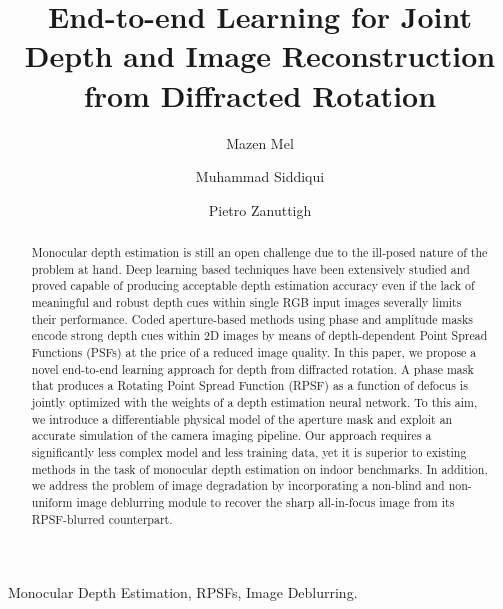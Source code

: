 \documentclass[preprint,5p,twocolumn]{elsarticle}
\begin{document}
\begin{frontmatter}

\title{End-to-end Learning for Joint Depth and Image Reconstruction from Diffracted Rotation}








\author[unipd]{Mazen Mel}
\author[sony]{ Muhammad Siddiqui}
\author[unipd]{Pietro Zanuttigh}


\address[unipd]{Department
of Information Engineering, University of Padova, Italy.}
\address[sony]{Sony Europe B.V., Zweigniederlassung Deutschland Stuttgart Technology Center, Stuttgart, Germany.}

\begin{abstract}
Monocular depth estimation is still an open challenge due to the ill-posed nature of the problem at hand. Deep learning based techniques have been extensively studied and proved capable of producing acceptable depth estimation accuracy even if the lack of meaningful and robust depth cues within single RGB input images severally limits their performance. Coded aperture-based methods using phase and amplitude masks encode strong depth cues within 2D images by means of depth-dependent Point Spread Functions (PSFs) at the price of a reduced image quality. In this paper, we propose a novel end-to-end learning approach for depth from diffracted rotation. A phase mask that produces a Rotating Point Spread Function (RPSF) as a function of defocus is jointly optimized with the weights of a depth estimation neural network. To this aim, we introduce a differentiable physical model of the aperture mask and exploit  an  accurate  simulation  of  the camera  imaging  pipeline. Our approach requires a significantly less complex model and less training data, yet it is superior to existing methods in the task of monocular depth estimation on indoor benchmarks. In addition, we address the problem of image degradation by incorporating a non-blind and non-uniform image deblurring module to recover the sharp all-in-focus image from its RPSF-blurred counterpart.
\end{abstract}

\begin{keyword}
 Monocular Depth Estimation, RPSFs, Image Deblurring.
\end{keyword}

\end{frontmatter}
\end{document}

